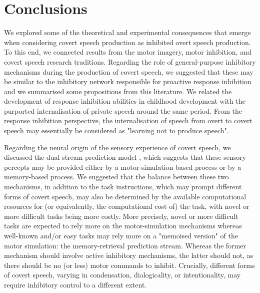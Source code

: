 \documentclass[utf8]{template/frontiersSCNS} %
\begin{document}
\section{Conclusions}


We explored some of the theoretical and experimental consequences that emerge when considering covert speech production as inhibited overt speech production. To this end,  we connected results from the motor imagery, motor inhibition, and covert speech research traditions. Regarding the role of general-purpose inhibitory mechanisms during the production of covert speech, we suggested that these may be similar to the inhibitory network responsible for proactive response inhibition and we summarised some propositions from this literature. We related the development of response inhibition abilities in childhood development with the purported internalisation of private speech around the same period. From the response inhibition perspective, the internalisation of speech from overt to covert speech may essentially be considered as "learning not to produce speech".

Regarding the neural origin of the sensory experience of covert speech, we discussed the dual stream prediction model \citep{tian_mental_2012, tian_effect_2013, tian_mental_2016}, which suggests that these sensory percepts may be provided either by a motor-simulation-based process or by a memory-based process. We suggested that the balance between these two mechanisms, in addition to the task instructions, which may prompt different forms of covert speech, may also be determined by the available computational resources for (or equivalently, the computational cost of) the task, with novel or more difficult tasks being more costly. More precisely, novel or more difficult tasks are expected to rely more on the motor-simulation mechanisms whereas well-known and/or easy tasks may rely more on a "memoised version" of the motor simulation: the memory-retrieval prediction stream. Whereas the former mechanism should involve active inhibitory mechanisms, the latter should not, as there should be no (or less) motor commands to inhibit. Crucially, different forms of covert speech, varying in condensation, dialogicality, or intentionality, may require inhibitory control to a different extent.
\end{document}
